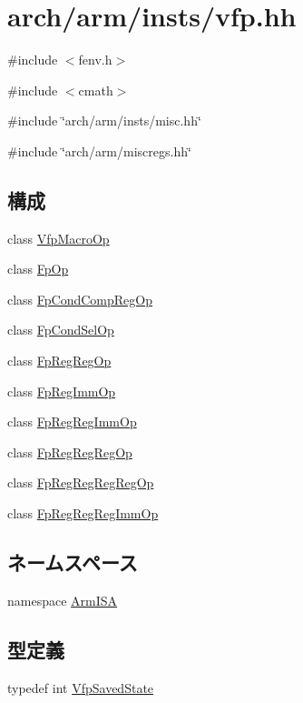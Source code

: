 \hypertarget{vfp_8hh}{
\section{arch/arm/insts/vfp.hh}
\label{vfp_8hh}
}
{\ttfamily \#include $<$fenv.h$>$}\par
{\ttfamily \#include $<$cmath$>$}\par
{\ttfamily \#include \char`\"{}arch/arm/insts/misc.hh\char`\"{}}\par
{\ttfamily \#include \char`\"{}arch/arm/miscregs.hh\char`\"{}}\par
\subsection*{構成}
\begin{DoxyCompactItemize}
\item 
class \hyperlink{classArmISA_1_1VfpMacroOp}{VfpMacroOp}
\item 
class \hyperlink{classArmISA_1_1FpOp}{FpOp}
\item 
class \hyperlink{classArmISA_1_1FpCondCompRegOp}{FpCondCompRegOp}
\item 
class \hyperlink{classArmISA_1_1FpCondSelOp}{FpCondSelOp}
\item 
class \hyperlink{classArmISA_1_1FpRegRegOp}{FpRegRegOp}
\item 
class \hyperlink{classArmISA_1_1FpRegImmOp}{FpRegImmOp}
\item 
class \hyperlink{classArmISA_1_1FpRegRegImmOp}{FpRegRegImmOp}
\item 
class \hyperlink{classArmISA_1_1FpRegRegRegOp}{FpRegRegRegOp}
\item 
class \hyperlink{classArmISA_1_1FpRegRegRegRegOp}{FpRegRegRegRegOp}
\item 
class \hyperlink{classArmISA_1_1FpRegRegRegImmOp}{FpRegRegRegImmOp}
\end{DoxyCompactItemize}
\subsection*{ネームスペース}
\begin{DoxyCompactItemize}
\item 
namespace \hyperlink{namespaceArmISA}{ArmISA}
\end{DoxyCompactItemize}
\subsection*{型定義}
\begin{DoxyCompactItemize}
\item 
typedef int \hyperlink{namespaceArmISA_aa704d806344cb853548d32c6a48b07e1}{VfpSavedState}
\end{DoxyCompactItemize}
